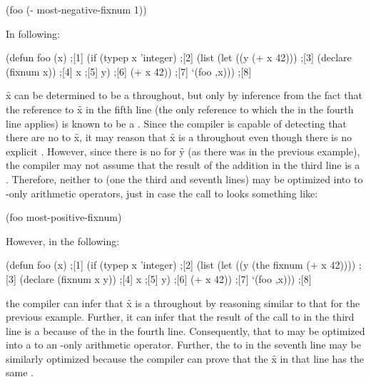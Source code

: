 \code
 (foo (- most-negative-fixnum 1))
\endcode

In following:

\code
 (defun foo (x)                               ;[1]
   (if (typep x 'integer)                     ;[2]
       (list (let ((y (+ x 42)))              ;[3]
               (declare (fixnum x))           ;[4]
               x                              ;[5]
               y)                             ;[6]
             (+ x 42))                        ;[7]
       `(foo ,x)))                            ;[8]
\endcode

\f{x} can be determined to be a  throughout, but only by inference
from the fact that the reference to \f{x} in the fifth line
(the only reference to which the  
in the fourth line applies) 
is known to be a .  Since the compiler is capable of detecting that
there are no  to \f{x}, it may reason that \f{x} is a 
throughout even though there is no explicit .
However, since there is no   for \f{y} (as there
was in the previous example), the compiler may not assume that the result of the
addition in the third line is a .  Therefore, 
neither  to \funref{+} (one the third and seventh lines) 
may be optimized into  to  
-only arithmetic operators,
just in case the call to  looks something like:

\code
 (foo most-positive-fixnum)
\endcode

However, in the following:

\code
 (defun foo (x)                               ;[1]
   (if (typep x 'integer)                     ;[2]
       (list (let ((y (the fixnum (+ x 42)))) ;[3]
               (declare (fixnum x y))         ;[4]
               x                              ;[5]
               y)                             ;[6]
             (+ x 42))                        ;[7]
       `(foo ,x)))                            ;[8]
\endcode

the compiler can infer that \f{x} is a  throughout by reasoning similar
to that for the previous example.  Further, it can infer that the result of the 
call to \funref{+} in the third line is a  because of the 
 in the fourth line.  Consequently, that  to \funref{+}
may be optimized into a  to an  
-only arithmetic operator.  Further, the  to \funref{+}
in the seventh line may be similarly optimized because the compiler can prove that
the \f{x} in that line has the same .

